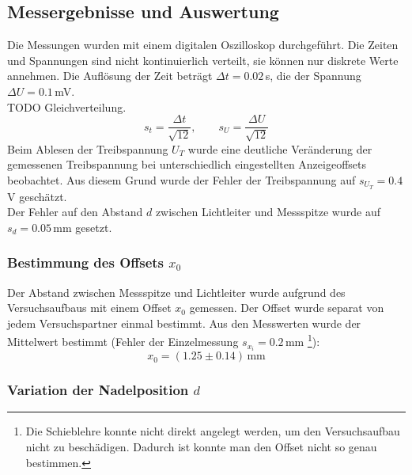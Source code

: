 \subsection{Messergebnisse und Auswertung}
Die Messungen wurden mit einem digitalen Oszilloskop durchgeführt. Die Zeiten und Spannungen sind nicht kontinuierlich verteilt, sie können 
nur diskrete Werte annehmen. Die Auflösung der Zeit beträgt $\Delta t = 0.02$\,\textmu s, die der Spannung $\Delta U = 0.1$\,mV. \\
TODO Gleichverteilung. %
\begin{equation}
  s_t = \frac{\Delta t}{\sqrt{12}}, \qquad s_U = \frac{\Delta U}{\sqrt{12}}
\end{equation}
Beim Ablesen der Treibspannung $U_T$ wurde eine deutliche Veränderung der gemessenen Treibspannung bei unterschiedlich eingestellten 
Anzeigeoffsets beobachtet. Aus diesem Grund wurde der Fehler der Treibspannung auf $s_{U_T} = 0.4$\,V geschätzt. \\
Der Fehler auf den Abstand $d$ zwischen Lichtleiter und Messspitze wurde auf $s_d = 0.05$\,mm gesetzt.
\subsubsection{Bestimmung des Offsets \texorpdfstring{$x_0$}{x0}}
Der Abstand zwischen Messspitze und Lichtleiter wurde aufgrund des Versuchsaufbaus mit einem Offset $x_0$ gemessen. Der Offset wurde separat 
von jedem Versuchspartner einmal bestimmt. Aus den Messwerten wurde der Mittelwert bestimmt (Fehler der Einzelmessung 
$s_{x_i} = 0.2$\,mm \footnote{Die Schieblehre konnte nicht direkt angelegt werden, um den Versuchsaufbau nicht zu beschädigen. 
Dadurch ist konnte man den Offset nicht so genau bestimmen.}):
\begin{equation}
  x_0 = (1.25 \pm 0.14)\,\text{mm}
\end{equation}
\subsubsection{Variation der Nadelposition \texorpdfstring{$d$}{d}}

